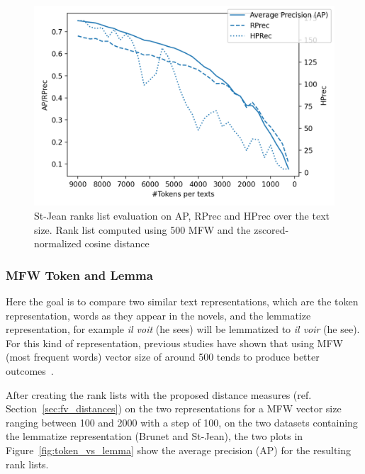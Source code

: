 \begin{figure}
  \centering
  \includegraphics[width=\linewidth]{img/degradation.png}
  \caption{St-Jean ranks list evaluation on AP, RPrec and HPrec over the text size.
  Rank list computed using 500 MFW and the zscored-normalized cosine distance}
  \label{img:degradation}
\end{figure}

\subsubsection{MFW Token and Lemma}
\label{sec:mfw_token_lemma}

Here the goal is to compare two similar text representations, which are the token representation, words as they appear in the novels, and the lemmatize representation, for example \textit{il voit} (he sees) will be lemmatized to \textit{il voir} (he see).
For this kind of representation, previous studies have shown that using MFW (most frequent words) vector size of around 500 tends to produce better outcomes~\cite{savoy_text_representation}.

After creating the rank lists with the proposed distance measures (ref. Section~\ref{sec:fv_distances}) on the two representations for a MFW vector size ranging between 100 and 2000 with a step of 100, on the two datasets containing the lemmatize representation (Brunet and St-Jean), the two plots in Figure~\ref{fig:token_vs_lemma} show the average precision (AP) for the resulting rank lists.

